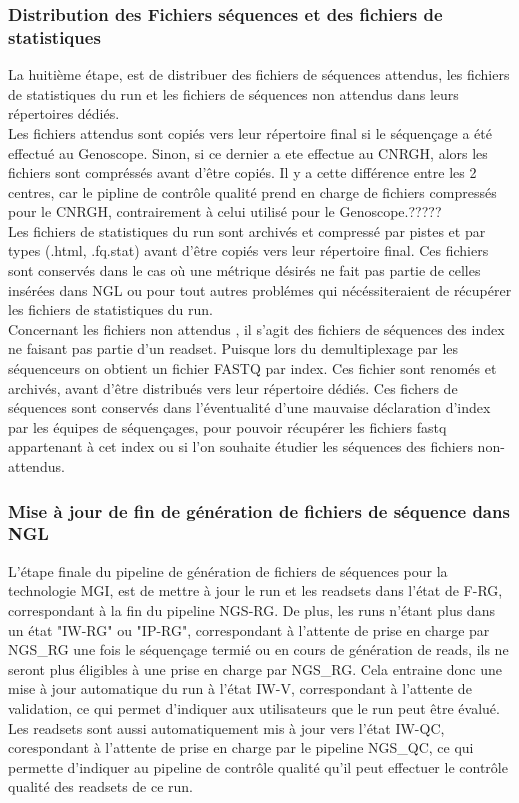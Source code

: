 \subsubsection*{Distribution des Fichiers séquences et des fichiers de statistiques}
La huitième étape, est de distribuer des fichiers de séquences \og attendus\fg{}, les fichiers de statistiques du run et les fichiers de séquences \og non attendus\fg{} dans leurs répertoires dédiés.\\

Les fichiers attendus sont copiés vers leur répertoire final si le séquençage a été effectué au Genoscope.
Sinon, si ce dernier a ete effectue au CNRGH, alors les fichiers sont compréssés avant d'être copiés.
Il y a cette différence entre les 2 centres, car le pipline de contrôle qualité prend en charge de fichiers compressés pour le CNRGH, contrairement à celui utilisé pour le Genoscope.?????\\

Les fichiers de statistiques du run sont archivés et compressé par pistes et par types (.html, .fq.stat) avant d'être copiés vers leur répertoire final.
Ces fichiers sont conservés dans le cas où une métrique désirés ne fait pas partie de celles insérées dans NGL ou pour tout autres problémes qui nécéssiteraient de récupérer les fichiers de statistiques du run.\\

Concernant les fichiers \og non attendus \fg{}, il s'agit des fichiers de séquences des index ne faisant pas partie d'un readset. Puisque lors du demultiplexage par les séquenceurs on obtient un fichier FASTQ par index.
Ces fichier sont renomés et archivés, avant d'être distribués vers leur répertoire dédiés.
Ces fichers de séquences sont conservés dans l'éventualité d'une mauvaise déclaration d'index par les équipes de séquençages, pour pouvoir récupérer les fichiers fastq appartenant à cet index ou si l'on souhaite étudier les séquences des fichiers \og non-attendus\fg{}.\\

\subsubsection*{Mise à jour de fin de génération de fichiers de séquence dans NGL}
L'étape finale du pipeline de génération de fichiers de séquences pour la technologie MGI, est de mettre à jour le run et les readsets dans l'état de \og F-RG\fg{}, correspondant à la fin du pipeline NGS-RG.
De plus, les runs n'étant plus dans un état "IW-RG" ou "IP-RG", correspondant à l'attente de prise en charge par NGS\_RG une fois le séquençage termié ou en cours de génération de reads, ils ne seront plus éligibles à une prise en charge par NGS\_RG.
Cela entraine donc une mise à jour automatique du run à l'état \og IW-V\fg{}, correspondant à l'attente de validation, ce qui permet d'indiquer aux utilisateurs que le run peut être évalué.
Les readsets sont aussi automatiquement mis à jour vers l'état \og IW-QC\fg{}, corespondant à l'attente de prise en charge par le pipeline NGS\_QC, ce qui permette d'indiquer au pipeline de contrôle qualité qu'il peut effectuer le contrôle qualité des readsets de ce run.

